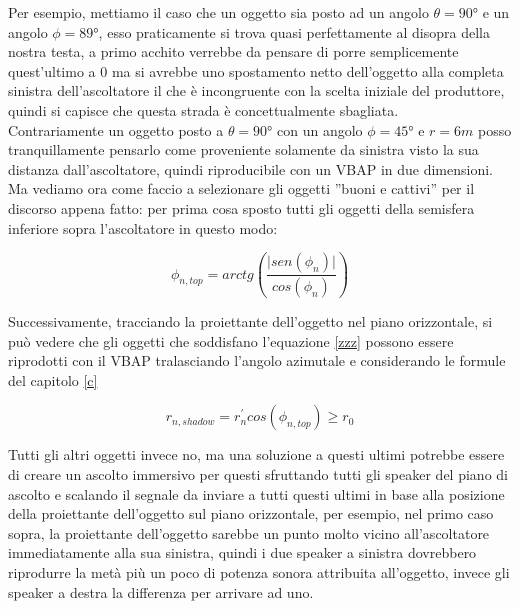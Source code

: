 \documentclass[12pt,a4paper]{report}
\begin{document}
Per esempio, mettiamo il caso che un oggetto sia posto ad un angolo $	\theta= 90° $ e un angolo $\phi=89°$, esso praticamente si trova quasi perfettamente al disopra della nostra testa, a primo acchito verrebbe da pensare di porre semplicemente quest'ultimo a $0$ ma si avrebbe uno spostamento netto dell'oggetto alla completa sinistra dell'ascoltatore il che è incongruente con la scelta iniziale del produttore, quindi si capisce che questa strada è concettualmente sbagliata.\\

Contrariamente un oggetto posto a $	\theta= 90° $ con un angolo $\phi=45°$ e $r=6m$ posso tranquillamente pensarlo come proveniente solamente da sinistra visto la sua distanza dall'ascoltatore, quindi riproducibile con un VBAP in due dimensioni.\\

Ma vediamo ora come faccio a selezionare gli oggetti ''buoni e cattivi'' per il discorso appena fatto: per prima cosa sposto tutti gli oggetti della semisfera inferiore sopra l'ascoltatore in questo modo:

\begin{equation}
\phi_{n,top} = arctg  \left( \dfrac{\vert sen(\phi_n) \vert}{ cos(\phi_n) } \right)
\label{  b}
\end{equation}

Successivamente, tracciando la proiettante dell'oggetto nel piano orizzontale, si può vedere che gli oggetti che soddisfano l'equazione \ref{zzz} possono essere riprodotti con il VBAP tralasciando l'angolo azimutale e considerando le formule del capitolo \ref{c}

\begin{equation}
r_{n,shadow}=r_n^{\prime} cos(\phi_{n,top}) \geq r_0
\label{zzz}
\end{equation}

Tutti gli altri oggetti invece no, ma una soluzione a questi ultimi potrebbe essere di creare un ascolto immersivo per questi sfruttando tutti gli speaker del piano di ascolto e scalando il segnale da inviare a tutti questi ultimi in base alla posizione della proiettante dell'oggetto sul piano orizzontale, per esempio, nel primo caso sopra, la proiettante dell'oggetto sarebbe un punto molto vicino all'ascoltatore immediatamente alla sua sinistra, quindi i due speaker a sinistra dovrebbero riprodurre la metà più un poco di potenza sonora attribuita all'oggetto, invece gli speaker a destra la differenza per arrivare ad uno.\\
\end{document}
